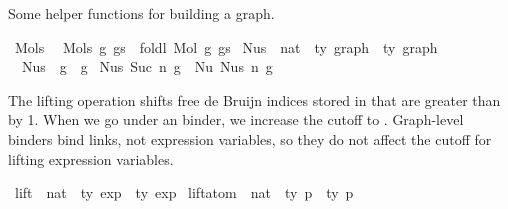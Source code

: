 \begin{isabellebody}
\begin{isamarkuptext}%
Some helper functions for building a graph.%
\end{isamarkuptext}\isamarkuptrue%
\isamarkupfalse%
\ Mols{}{\isacharcolon}{\kern0pt}\isanewline
\ \ {\isachardoublequoteopen}Mols{}\ g\ gs\ {\isacharequal}{\kern0pt}\ foldl\ Mol\ g\ gs{\isachardoublequoteclose}\isanewline
\isanewline
{}\isamarkupfalse%
\ Nus{}\ {\isacharcolon}{\kern0pt}{\isacharcolon}{\kern0pt}\ {\isachardoublequoteopen}nat\ {\isacharequal}{\kern0pt}{\isachargreater}{\kern0pt}\ {\isacharprime}{\kern0pt}ty\ graph\ {\isacharequal}{\kern0pt}{\isachargreater}{\kern0pt}\ {\isacharprime}{\kern0pt}ty\ graph{\isachardoublequoteclose}\ \isanewline
\ \ {\isachardoublequoteopen}Nus{}\ {}\ g\ {\isacharequal}{\kern0pt}\ g{\isachardoublequoteclose}\isanewline
{\isacharbar}{\kern0pt}\ {\isachardoublequoteopen}Nus{}\ {\isacharparenleft}{\kern0pt}Suc\ n{\isacharparenright}{\kern0pt}\ g\ {\isacharequal}{\kern0pt}\ Nu\ {\isacharparenleft}{\kern0pt}Nus{}\ n\ g{\isacharparenright}{\kern0pt}{\isachardoublequoteclose}%
\isadelimdocument
%
\endisadelimdocument
%
\isatagdocument
%
\isamarkuptrue%
%
\endisatagdocument
{\isafolddocument}%
%
\isadelimdocument
%
\endisadelimdocument
%
\begin{isamarkuptext}%
The lifting operation  shifts free de Bruijn indices
stored in  that are greater than by 1.
When we go under an  binder, we increase the cutoff to .
Graph-level binders  bind links, not expression variables,
so they do not affect the cutoff for lifting expression variables.%
\end{isamarkuptext}\isamarkuptrue%
\isamarkupfalse%
\ lift\ {\isacharcolon}{\kern0pt}{\isacharcolon}{\kern0pt}\ {\isachardoublequoteopen}nat\ {\isacharequal}{\kern0pt}{\isachargreater}{\kern0pt}\ {\isacharprime}{\kern0pt}ty\ exp\ {\isacharequal}{\kern0pt}{\isachargreater}{\kern0pt}\ {\isacharprime}{\kern0pt}ty\ exp{\isachardoublequoteclose}\isanewline
{}\ lift{\isacharunderscore}{\kern0pt}atom\ {\isacharcolon}{\kern0pt}{\isacharcolon}{\kern0pt}\ {\isachardoublequoteopen}nat\ {\isacharequal}{\kern0pt}{\isachargreater}{\kern0pt}\ {\isacharprime}{\kern0pt}ty\ p\ {\isacharequal}{\kern0pt}{\isachargreater}{\kern0pt}\ {\isacharprime}{\kern0pt}ty\ p{\isachardoublequoteclose}\isanewline

\end{isabellebody}
